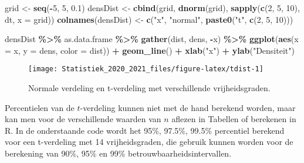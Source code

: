 \documentclass[
  12pt,dutch,coursenotes]{book}
\newenvironment{Shaded}{\begin{snugshade}}{\end{snugshade}}
\newcommand{\DataTypeTok}[1]{\textcolor[rgb]{0.13,0.29,0.53}{#1}}
\newcommand{\DecValTok}[1]{\textcolor[rgb]{0.00,0.00,0.81}{#1}}
\newcommand{\FloatTok}[1]{\textcolor[rgb]{0.00,0.00,0.81}{#1}}
\newcommand{\KeywordTok}[1]{\textcolor[rgb]{0.13,0.29,0.53}{\textbf{#1}}}
\newcommand{\NormalTok}[1]{#1}
\newcommand{\OperatorTok}[1]{\textcolor[rgb]{0.81,0.36,0.00}{\textbf{#1}}}
\newcommand{\StringTok}[1]{\textcolor[rgb]{0.31,0.60,0.02}{#1}}
\theoremstyle{definition}
\theoremstyle{definition}
\theoremstyle{definition}
\theoremstyle{remark}
\begin{document}
\begin{Shaded}
\begin{Highlighting}[]
\NormalTok{grid \textless{}{-}}\StringTok{ }\KeywordTok{seq}\NormalTok{(}\OperatorTok{{-}}\DecValTok{5}\NormalTok{, }\DecValTok{5}\NormalTok{, }\FloatTok{0.1}\NormalTok{)}
\NormalTok{densDist \textless{}{-}}\StringTok{ }\KeywordTok{cbind}\NormalTok{(grid, }\KeywordTok{dnorm}\NormalTok{(grid), }\KeywordTok{sapply}\NormalTok{(}\KeywordTok{c}\NormalTok{(}\DecValTok{2}\NormalTok{, }\DecValTok{5}\NormalTok{, }
    \DecValTok{10}\NormalTok{), dt, }\DataTypeTok{x =}\NormalTok{ grid))}
\KeywordTok{colnames}\NormalTok{(densDist) \textless{}{-}}\StringTok{ }\KeywordTok{c}\NormalTok{(}\StringTok{"x"}\NormalTok{, }\StringTok{"normal"}\NormalTok{, }\KeywordTok{paste0}\NormalTok{(}\StringTok{"t"}\NormalTok{, }
    \KeywordTok{c}\NormalTok{(}\DecValTok{2}\NormalTok{, }\DecValTok{5}\NormalTok{, }\DecValTok{10}\NormalTok{)))}

\NormalTok{densDist }\OperatorTok{\%\textgreater{}\%}\StringTok{ }\NormalTok{as.data.frame }\OperatorTok{\%\textgreater{}\%}\StringTok{ }\KeywordTok{gather}\NormalTok{(dist, dens, }\OperatorTok{{-}}\NormalTok{x) }\OperatorTok{\%\textgreater{}\%}\StringTok{ }
\StringTok{    }\KeywordTok{ggplot}\NormalTok{(}\KeywordTok{aes}\NormalTok{(}\DataTypeTok{x =}\NormalTok{ x, }\DataTypeTok{y =}\NormalTok{ dens, }\DataTypeTok{color =}\NormalTok{ dist)) }\OperatorTok{+}\StringTok{ }\KeywordTok{geom\_line}\NormalTok{() }\OperatorTok{+}\StringTok{ }
\StringTok{    }\KeywordTok{xlab}\NormalTok{(}\StringTok{"x"}\NormalTok{) }\OperatorTok{+}\StringTok{ }\KeywordTok{ylab}\NormalTok{(}\StringTok{"Densiteit"}\NormalTok{)}
\end{Highlighting}
\end{Shaded}

\begin{figure}

{\centering \texttt{[image: Statistiek\_2020\_2021\_files/figure-latex/tdist-1]} 

}

\caption{Normale verdeling en t-verdeling met verschillende vrijheidsgraden.}\label{fig:tdist}
\end{figure}

Percentielen van de \(t\)-verdeling kunnen niet met de hand berekend worden,
maar kan men voor de verschillende waarden van \(n\) aflezen in Tabellen of berekenen in R.
In de onderstaande code wordt het 95\%, 97.5\%, 99.5\% percentiel berekend voor een t-verdeling met 14 vrijheidsgraden, die gebruik kunnen worden voor de berekening van 90\%, 95\% en 99\% betrouwbaarheidsintervallen.
\end{document}

